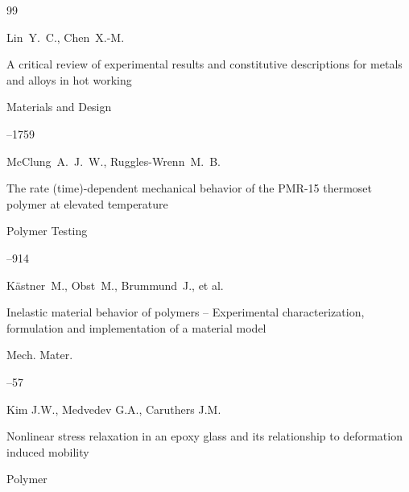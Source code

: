 \begin{thebibliography}{99}

\by Lin~Y.~C., Chen~X.-M.

\paper A critical review of experimental results and constitutive descriptions for metals and alloys in hot working

\jour Materials and Design




--1759







\by McClung~A.~J.~W., Ruggles-Wrenn~M.~B.

\paper The rate (time)-dependent mechanical behavior of the PMR-15 thermoset polymer at elevated temperature 

\jour Polymer Testing




--914







\by K\"astner~M., Obst~M., Brummund~J., et al.

\paper Inelastic material behavior of polymers -- Experimental characterization, formulation and implementation of a material model

\jour Mech. Mater.



--57







\by Kim J.W., Medvedev G.A., Caruthers J.M.

\paper Nonlinear stress relaxation in an epoxy glass and its relationship to deformation induced mobility

\jour Polymer




\end{thebibliography}
